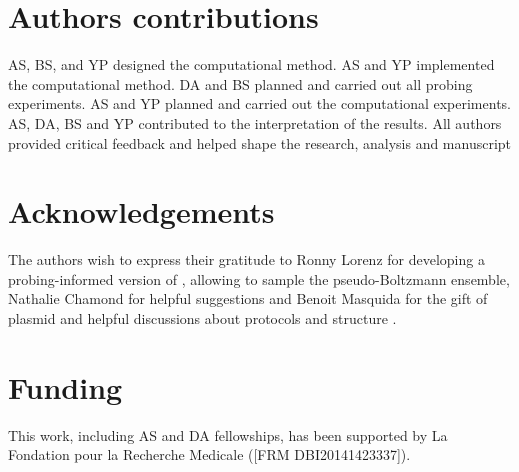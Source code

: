 \documentclass[a4,center,fleqn]{NAR}
\begin{document}
\section*{Authors contributions}
AS, BS, and YP designed the computational method. 
AS and YP implemented the computational method.
DA and BS planned and carried out all probing experiments.
AS and YP planned and carried out the computational experiments. 
AS, DA, BS and YP contributed to the interpretation of the results. 
All authors provided critical feedback and helped shape the research, analysis and manuscript

\section*{Acknowledgements}
The authors wish to express their gratitude to Ronny Lorenz for developing a probing-informed version of , allowing to sample the pseudo-Boltzmann ensemble, Nathalie Chamond for helpful suggestions and Benoit Masquida for the gift of \didy{} plasmid and helpful discussions about protocols and \didy{} structure .

\section*{Funding}
This work, including AS and DA  fellowships, has been supported by La Fondation pour la Recherche Medicale ([FRM
DBI20141423337]).
%


\end{document}
